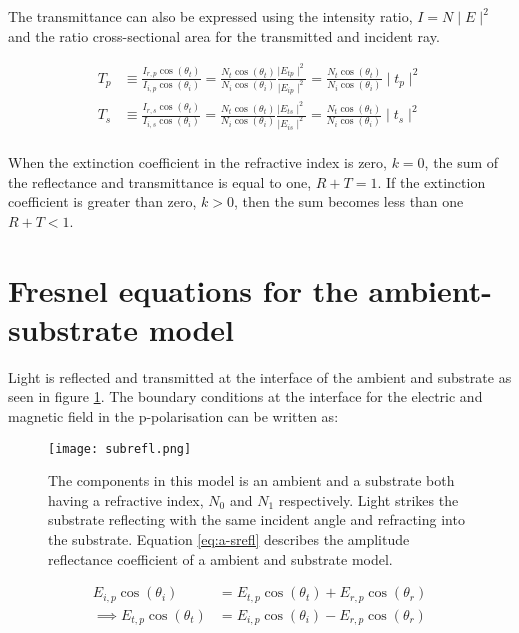 \documentclass[MasterThesisMain.tex]{subfiles}
\begin{document}
The transmittance can also be expressed using the intensity ratio, $I = N \mid E \mid^2$ and the ratio cross-sectional area for the transmitted and incident ray.

\begin{align}
T_p &\equiv \frac{I_{r,p}\cos(\theta_t)}{I_{i,p}\cos(\theta_i)} = \frac{N_t\cos(\theta_t)}{N_i\cos(\theta_i)}\frac{\mid E_{tp} \mid^2}{\mid E_{ip} \mid^2} = \frac{N_t\cos(\theta_t)}{N_i\cos(\theta_i)} \mid t_{p} \mid^2\\
T_s &\equiv \frac{I_{r,s}\cos(\theta_t)}{I_{i,s}\cos(\theta_i)} = \frac{N_t\cos(\theta_t)}{N_i\cos(\theta_i)}\frac{\mid E_{ts} \mid^2}{\mid E_{is} \mid^2} = \frac{N_t\cos(\theta_t)}{N_i\cos(\theta_i)} \mid t_{s} \mid^2\\
\end{align}

When the extinction coefficient in the refractive index is zero, $k=0$, the sum of the reflectance and transmittance is equal to one, $R + T = 1$. If the extinction coefficient is greater than zero, $k>0$, then the sum becomes less than one $R + T < 1$.	
\section{Fresnel equations for the ambient-substrate model}\label{ch:fresnelref}
Light is reflected and transmitted at the interface of the ambient and substrate as seen in figure \ref{fig:subrefl}. The boundary conditions at the interface for the electric and magnetic field in the p-polarisation can be written as:

\begin{figure}
\begin{center}
\texttt{[image: subrefl.png]}
\caption{The components in this model is an ambient and a substrate both having a refractive index, $N_0$ and $N_1$ respectively. Light strikes the substrate reflecting with the same incident angle and refracting into the substrate. Equation \ref{eq:a-srefl} describes the amplitude reflectance coefficient of a ambient and substrate model.}
\label{fig:subrefl}
\end{center}
\end{figure}

\begin{align} 
E_{i,p}\cos{(\theta_i)} &= E_{t,p}\cos{(\theta_t)} + E_{r,p}\cos{(\theta_r)}\\
\implies E_{t,p}\cos{(\theta_t)} &= E_{i,p}\cos{(\theta_i)} - E_{r,p}\cos{(\theta_r)}\label{elbound}
\end{align} 
\end{document}
